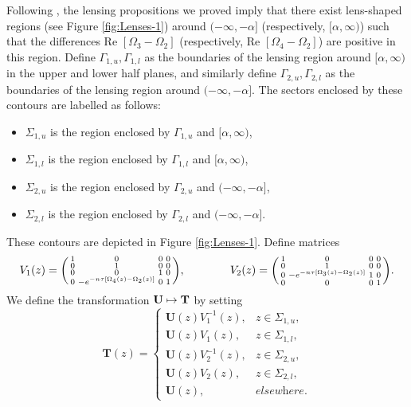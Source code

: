 \documentclass[usenames,dvipsnames]{article}
\theoremstyle{definition}
\numberwithin{equation}{section}
\numberwithin{figure}{section}
\begin{document}
Following \cite{DHL1}, the lensing propositions we proved imply that there exist lens-shaped regions (see Figure \ref{fig:Lenses-1}) around $(-\infty,-\alpha]$ (respectively, $[\alpha,\infty)$) such that the differences $\text{Re }[\Omega_3-\Omega_2]$ (respectively, $\text{Re }[\Omega_4-\Omega_2]$) are positive in this region. Define $\Gamma_{1,u},\Gamma_{1,l}$ as the boundaries of the lensing region around $[\alpha,\infty)$ in the upper and lower half planes, and similarly define $\Gamma_{2,u},\Gamma_{2,l}$ as the boundaries of the lensing region around $(-\infty,-\alpha]$.
The sectors enclosed by these contours are labelled as follows:
    \begin{itemize}
        \item $\Sigma_{1,u}$ is the region enclosed by $\Gamma_{1,u}$ and $[\alpha,\infty)$,
        \item $\Sigma_{1,l}$ is the region enclosed by $\Gamma_{1,l}$ and $[\alpha,\infty)$,
        \item $\Sigma_{2,u}$ is the region enclosed by $\Gamma_{2,u}$ and $(-\infty,-\alpha]$,
        \item $\Sigma_{2,l}$ is the region enclosed by $\Gamma_{2,l}$ and $(-\infty,-\alpha]$.
    \end{itemize}
These contours are depicted in Figure \ref{fig:Lenses-1}. Define matrices
    \begin{equation}
        V_1(z) = 
        \begin{psmallmatrix}
            1 & 0 & 0 & 0\\
            0 & 1 & 0 & 0\\
            0 & 0 & 1 & 0\\
            0 & -e^{-n\tau[\Omega_4(z) - \Omega_2(z)]} & 0 & 1
        \end{psmallmatrix}, \qquad\qquad
        V_2(z) = 
        \begin{psmallmatrix}
            1 & 0 & 0 & 0\\
            0 & 1 & 0 & 0\\
            0 & -e^{-n\tau[\Omega_3(z) - \Omega_2(z)]} & 1 & 0\\
            0 & 0 & 0 & 1
        \end{psmallmatrix}.
    \end{equation}
We define the transformation ${\bf U} \mapsto {\bf T}$ by setting
    \begin{equation}
        \boldsymbol{T}(z) = 
        \begin{cases}
            \boldsymbol{U}(z) V_1^{-1}(z), & z \in \Sigma_{1,u},\\
            \boldsymbol{U}(z) V_1(z), & z \in \Sigma_{1,l},\\
            \boldsymbol{U}(z) V_2^{-1}(z), & z \in \Sigma_{2,u},\\
            \boldsymbol{U}(z) V_2(z), & z \in \Sigma_{2,l},\\
            \boldsymbol{U}(z), & \textit{elsewhere}.
        \end{cases}
    \end{equation}
\end{document}
